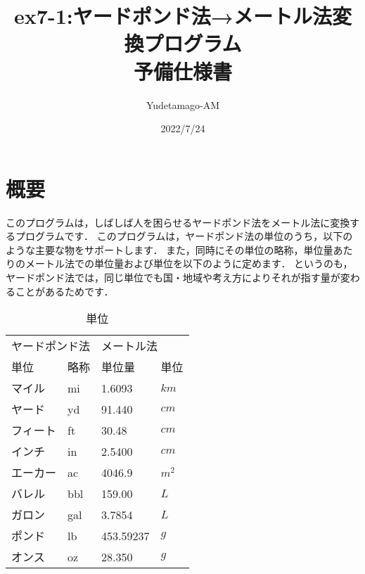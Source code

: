 \documentclass[a4paper,11pt]{jsarticle}
\begin{document}
\title{ex7-1:ヤードポンド法→メートル法変換プログラム\\{\Large 予備仕様書}}
\author{Yudetamago-AM}
\date{2022/7/24}
\maketitle

\section*{概要}

このプログラムは，しばしば人を困らせるヤードポンド法をメートル法に変換するプログラムです．
このプログラムは，ヤードポンド法の単位のうち，以下のような主要な物をサポートします．
また，同時にその単位の略称，単位量あたりのメートル法での単位量および単位を以下のように定めます．
というのも，ヤードポンド法では，同じ単位でも国・地域や考え方によりそれが指す量が変わることがあるためです．

\begin{table}[h]
  \caption{単位}
  \centering
  \begin{tabular}{llll}
    \hline
    \multicolumn{2}{l}{ヤードポンド法} & \multicolumn{2}{l}{メートル法}\\
    単位 & 略称 & 単位量 & 単位\\
    \hline \hline
    マイル & mi & 1.6093 & $ km $\\
    ヤード & yd & 91.440 & $ cm $\\
    フィート & ft & 30.48 & $ cm $\\
    インチ & in & 2.5400 & $ cm $\\
    エーカー & ac & 4046.9 & $ m^2 $\\
    バレル & bbl & 159.00 & $ L $\\
    ガロン & gal & 3.7854 & $ L $\\
    ポンド & lb & 453.59237 & $ g $\\
    オンス & oz & 28.350 & $ g $\\
    \hline
  \end{tabular}
\end{table}
\end{document}
